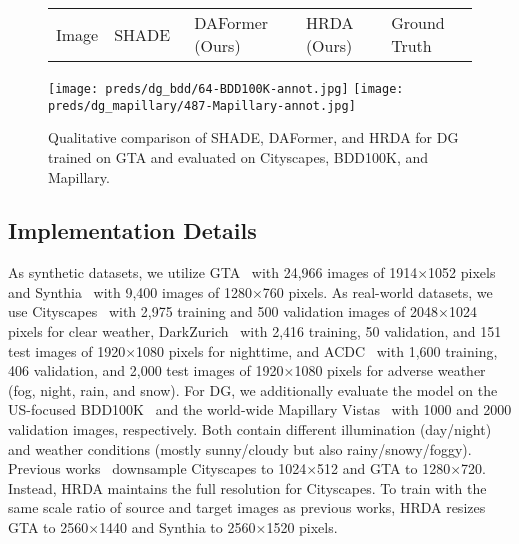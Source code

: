 \documentclass[journal,compsoc]{IEEEtran}
\begin{document}
\begin{figure*}[tb]
\centering
\begin{minipage}{0.8\linewidth}
{\footnotesize
\begin{tabularx}{\linewidth}{*{5}{Y}}
Image & SHADE~\cite{zhao2022style} & DAFormer (Ours) & HRDA (Ours) & Ground Truth \\
\end{tabularx}
} %
\texttt{[image: preds/dg\_bdd/64-BDD100K-annot.jpg]}
\texttt{[image: preds/dg\_mapillary/487-Mapillary-annot.jpg]}
\end{minipage}
\caption{Qualitative comparison of SHADE, DAFormer, and HRDA for DG trained on GTA and evaluated on Cityscapes, BDD100K, and Mapillary.}
\label{fig:visual_examples_dg}
\end{figure*}

\subsection{Implementation Details}

As synthetic datasets, we utilize GTA~\cite{richter2016playing} with 24,966 images of 1914$\times$1052 pixels and Synthia~\cite{ros2016synthia} with 9,400 images of 1280$\times$760 pixels. As real-world datasets, we use Cityscapes~\cite{cordts2016cityscapes} with 2,975 training and 500 validation images of 2048${\times}$1024 pixels for clear weather, DarkZurich~\cite{sakaridis2020map} with 2,416 training, 50 validation, and 151 test images of 1920${\times}$1080 pixels for nighttime, and ACDC~\cite{sarkadis2021acdc} with 1,600 training, 406 validation, and 2,000 test images of 1920${\times}$1080 pixels for adverse weather (fog, night, rain, and snow). For DG, we additionally evaluate the model on the US-focused BDD100K~\cite{yu2020bdd100k} and the world-wide Mapillary Vistas~\cite{neuhold2017mapillary} with 1000 and 2000 validation images, respectively.
Both contain different illumination (day/night) and weather conditions (mostly sunny/cloudy but also rainy/snowy/foggy).
Previous works~\cite{tsai2018learning,tranheden2021dacs,araslanov2021self} downsample Cityscapes to 1024${\times}$512 and GTA to 1280${\times}$720. Instead, HRDA maintains the full resolution for Cityscapes. To train with the same scale ratio of source and target images as previous works, HRDA resizes GTA to 2560${\times}$1440 and Synthia to 2560${\times}$1520 pixels.
\end{document}
